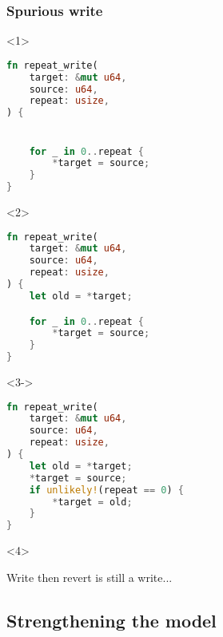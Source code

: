 
\begin{frame}[fragile, t]
    \frametitle{{\xmark} Spurious write}
    \begin{onlyenv}<1>
        \begin{block}{}
            \begin{lstlisting}[language=rust]
fn repeat_write(
    target: &mut u64,
    source: u64,
    repeat: usize,
) {


    for _ in 0..repeat {
        *target = source;
    }
}
            \end{lstlisting}
        \end{block}
    \end{onlyenv}

    \begin{onlyenv}<2>
        \begin{block}{}
            \begin{lstlisting}[language=rust]
fn repeat_write(
    target: &mut u64,
    source: u64,
    repeat: usize,
) {
    let old = *target;

    for _ in 0..repeat {
        *target = source;
    }
}
            \end{lstlisting}
        \end{block}
    \end{onlyenv}

    \begin{onlyenv}<3->
        \begin{block}{}
            \begin{lstlisting}[language=rust]
fn repeat_write(
    target: &mut u64,
    source: u64,
    repeat: usize,
) {
    let old = *target;
    *target = source;
    if unlikely!(repeat == 0) {
        *target = old;
    }
}
            \end{lstlisting}
        \end{block}
    \end{onlyenv}

    \begin{onlyenv}<4>
        \begin{block}{}
            Write then revert is still a write...
        \end{block}
    \end{onlyenv}
\end{frame}

\subsection{Strengthening the model}

